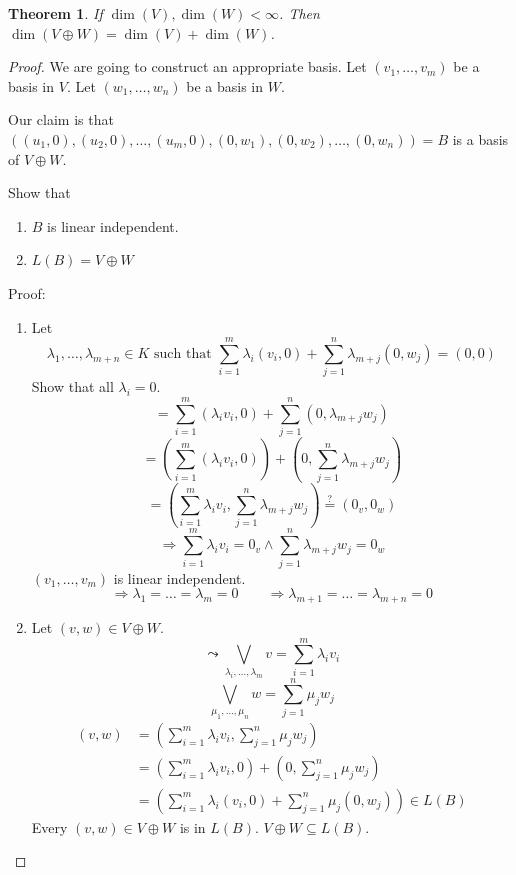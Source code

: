 \documentclass[a4paper,landscape,twocolumn]{article}
\newtheorem{theorem}{Theorem}
\begin{document}
\begin{theorem}
  \label{satz-4-17}
  If $\dim(V), \dim(W) < \infty$. Then $\dim(V \oplus W) = \dim(V) + \dim(W)$.
\end{theorem}
\begin{proof}
  We are going to construct an appropriate basis.
  Let $(v_1, \dots, v_m)$ be a basis in $V$.
  Let $(w_1, \dots, w_n)$ be a basis in $W$.

  Our claim is that $((u_1, 0), (u_2, 0), \dots, (u_m, 0), (0, w_1), (0, w_2), \dots, (0, w_n)) = B$
  is a basis of $V \oplus W$.

  Show that
  \begin{enumerate}
    \item $B$ is linear independent.
    \item $L(B) = V \oplus W$
  \end{enumerate}

  Proof:
  \begin{enumerate}
    \item Let
      \[ \lambda_1, \dots, \lambda_{m+n} \in K \text{ such that } \sum_{i=1}^{m} \lambda_i (v_i, 0) + \sum_{j=1}^n \lambda_{m+j} (0, w_j) = (0, 0) \]
      Show that all $\lambda_i = 0$.
      \[ = \sum_{i=1}^m (\lambda_i v_i, 0) + \sum_{j=1}^n (0, \lambda_{m+j} w_j) \]
      \[ = \left(\sum_{i=1}^m (\lambda_i v_i, 0)\right) + \left(0, \sum_{j=1}^n \lambda_{m+j} w_j\right) \]
      \[ = \left(\sum_{i=1}^m \lambda_i v_i, \sum_{j=1}^n \lambda_{m+j} w_j\right) \stackrel{?}{=} (0_v, 0_w) \]
      \[ \Rightarrow \sum_{i=1}^m \lambda_i v_i = 0_v \land \sum_{j=1}^n \lambda_{m+j} w_j = 0_w \]
      $(v_1, \dots, v_m)$ is linear independent.
      \[ \Rightarrow \lambda_1 = \dots = \lambda_m = 0 \qquad \Rightarrow \lambda_{m+1} = \dots = \lambda_{m+n} = 0 \]
    \item Let $(v, w) \in V \oplus W$.
      \[ \leadsto \bigvee_{\lambda_i, \dots, \lambda_m} v = \sum_{i=1}^m \lambda_i v_i \]
      \[ \bigvee_{\mu_1, \dots, \mu_n} w = \sum_{j=1}^n \mu_j w_j \]
      \begin{align*}
        (v, w) &= \left(\sum_{i=1}^m \lambda_i v_i, \sum_{j=1}^n \mu_j w_j \right) \\
               &= \left(\sum_{i=1}^m \lambda_i v_i, 0\right) + \left(0, \sum_{j=1}^n \mu_j w_j\right) \\
               &= \left(\sum_{i=1}^m \lambda_i (v_i, 0) + \sum_{j=1}^n \mu_j (0, w_j)\right) \in L(B)
      \end{align*}
      Every $(v, w) \in V \oplus W$ is in $L(B)$. $V \oplus W \subseteq L(B)$.
  \end{enumerate}
\end{proof}
\end{document}
